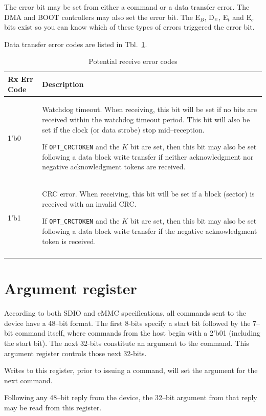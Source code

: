 \documentclass{gqtekspec}
\begin{document}
The error bit may be set from either a command or a data transfer error.
The DMA and BOOT controllers may also set the error bit.
The E$_B$, D$_{\mbox{\tiny E}}$, E$_t$ and E$_c$ bits exist so you can know
which of these types of errors triggered the error bit.

Data transfer error codes are listed in Tbl.~\ref{tbl:CMD-RXECODE}.
\begin{table}\begin{center}
\begin{tabular}{|p{1.2in}|p{4.0in}|}\hline
	\rowcolor[gray]{0.85} Rx Err Code & Description\\\hline\hline
1'b0 & Watchdog timeout.  When receiving, this bit will be set if no bits are
	received within the watchdog timeout period.  This bit will also be
	set if the clock (or data strobe) stop mid--reception.

	If {\tt OPT\_CRCTOKEN} and the $K$ bit are set, then this bit may also
	be set following a data block write transfer if neither acknowledgment
	nor negative acknowledgment tokens are received.\\
1'b1 & CRC error.  When receiving, this bit will be set if a block (sector) is
	received with an invalid CRC.

	If {\tt OPT\_CRCTOKEN} and the $K$ bit are set, then this bit may also
	be set following a data block write transfer if the negative
	acknowledgment token is received.\\
	\\\hline
\end{tabular}
\caption{Potential receive error codes}\label{tbl:CMD-RXECODE}
\end{center}\end{table}

\section{Argument register}
According to both SDIO and eMMC specifications, all commands sent to the
device have a 48--bit format.  The first 8-bits specify a start bit followed
by the 7--bit command itself, where commands from the host begin with a
2'b01 (including the start bit).  The next 32-bits constitute an argument
to the command.  This argument register controls those next 32-bits.

Writes to this register, prior to issuing a command, will set the argument
for the next command.

Following any 48--bit reply from the device, the 32--bit argument from that
reply may be read from this register.
\end{document}
